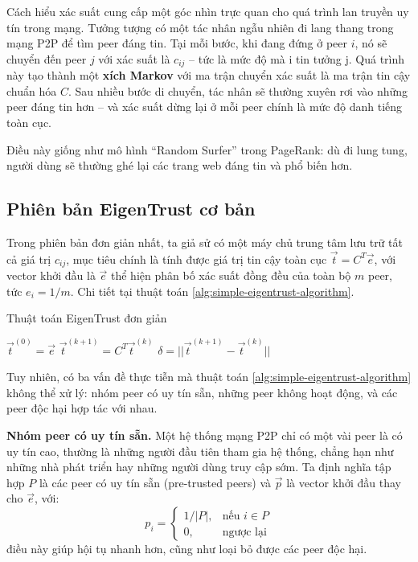 Cách hiểu xác suất cung cấp một góc nhìn trực quan cho quá trình lan truyền uy tín trong mạng. Tưởng tượng có một tác nhân ngẫu nhiên đi lang thang trong mạng P2P
để tìm peer đáng tin. Tại mỗi bước, khi đang đứng ở peer $i$, nó sẽ chuyển đến peer $j$ với xác suất là $c_{ij}$ -- tức là mức độ mà i tin tưởng j.
Quá trình này tạo thành một \textbf{xích Markov} \cite{markov-chain} với ma trận chuyển xác suất là ma trận tin cậy chuẩn hóa $C$.
Sau nhiều bước di chuyển, tác nhân sẽ thường xuyên rơi vào những peer đáng tin hơn -- và xác suất dừng lại ở mỗi peer chính là mức độ danh tiếng toàn cục.

Điều này giống như mô hình ``Random Surfer'' \cite{random-suffer-model-pagerank} trong PageRank:
dù đi lung tung, người dùng sẽ thường ghé lại các trang web đáng tin và phổ biến hơn.

\subsection{Phiên bản EigenTrust cơ bản}

Trong phiên bản đơn giản nhất, ta giả sử có một máy chủ trung tâm lưu trữ tất cả giá trị $c_{ij}$, mục tiêu chính là tính được giá trị tin cậy toàn cục
$\vec{t} = C^{T}\vec{e}$, với vector khởi đầu là $\vec{e}$ thể hiện phân bố xác suất đồng đều của toàn bộ $m$ peer, tức $e_i = 1/m$.
Chi tiết tại thuật toán \ref{alg:simple-eigentrust-algorithm}.

\begin{algorithm}
  \caption{Thuật toán EigenTrust đơn giản}
  \label{alg:simple-eigentrust-algorithm}
  \begin{algorithmic}
    \State $\vec{t}^{(0)} = \vec{e}$
    \Repeat
    \State $\vec{t}^{(k+1)} = C^{T}\vec{t}^{(k)}$
    \State $\delta = || \vec{t}^{(k+1)} - \vec{t}^{(k)} ||$
    \Until{$\delta < \epsilon$}
  \end{algorithmic}
\end{algorithm}

Tuy nhiên, có ba vấn đề thực tiễn mà thuật toán \ref{alg:simple-eigentrust-algorithm} không thể xử lý: nhóm peer có uy tín sẵn, những peer không hoạt động, và các peer độc hại hợp tác với nhau.

\textbf{Nhóm peer có uy tín sẵn.} Một hệ thống mạng P2P chỉ có một vài peer là có uy tín cao, thường là những người đầu tiên tham gia hệ thống, chẳng hạn như những nhà phát triển hay những người dùng truy cập sớm.
Ta định nghĩa tập hợp $P$ là các peer có uy tín sẵn (pre-trusted peers) và $\vec{p}$ là vector khởi đầu thay cho $\vec{e}$, với:
\[
  p_i =
  \begin{cases}
    1/|P|, & \text{nếu } i \in P \\
    0,     & \text{ngược lại}
  \end{cases}
\]
điều này giúp hội tụ nhanh hơn, cũng như loại bỏ được các peer độc hại.

